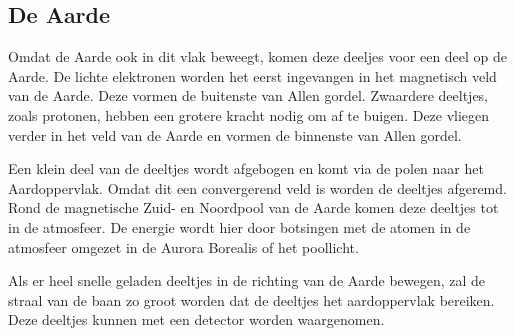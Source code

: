 \subsection{De Aarde}

Omdat de Aarde ook in dit vlak beweegt, komen deze deeljes voor een
deel op de Aarde. De lichte elektronen worden het eerst ingevangen
in het magnetisch veld van de Aarde. Deze vormen de buitenste van
Allen gordel. Zwaardere deeltjes, zoals protonen, hebben een grotere
kracht nodig om af te buigen. Deze vliegen verder in het veld van
de Aarde en vormen de binnenste van Allen gordel.

Een klein deel van de deeltjes wordt afgebogen en komt via de polen
naar het Aardoppervlak. Omdat dit een convergerend veld is worden
de deeltjes afgeremd. Rond de magnetische Zuid- en Noordpool van de
Aarde komen deze deeltjes tot in de atmosfeer. De energie wordt hier
door botsingen met de atomen in de atmosfeer omgezet in de Aurora
Borealis of het poollicht. 

Als er heel snelle geladen deeltjes in de richting van de Aarde bewegen,
zal de straal van de baan zo groot worden dat de deeltjes het aardoppervlak
bereiken. Deze deeltjes kunnen met een detector worden waargenomen.


